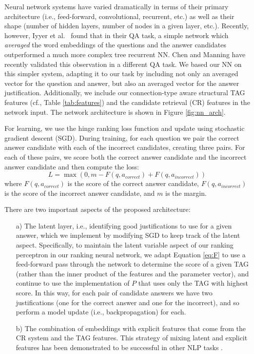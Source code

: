 {Neural network systems have varied dramatically in terms of their primary architecture (i.e., feed-forward, convolutional, recurrent, etc.) as well as their shape (number of hidden layers, number of nodes in a given layer, etc.).  Recently, however, Iyyer et al.~\citeyear{Iyyer2015} found that in their QA task, a simple network which \emph{averaged} the word embeddings of the questions and the answer candidates outperformed a much more complex tree recurrent NN.  
Chen and Manning \citeyear{chen2016acl} have recently validated this observation in a different QA task.
We based our NN on this simpler system, adapting it to our task by including not only an averaged vector for the question and answer, but also an averaged vector for the answer justification.  Additionally, we include our connection-type aware structural TAG features (cf., Table \ref{tab:features}) and the candidate retrieval (CR) features in the network input.  The network architecture is shown in Figure \ref{fig:nn_arch}.

For learning, we use the hinge ranking loss function \cite{collobert2011natural} and update using stochastic gradient descent (SGD).  During training, for each question we pair the correct answer candidate with each of the incorrect candidates, creating three pairs.  For each of these pairs, we score both the correct answer candidate and the incorrect answer candidate and then compute the loss:
\begin{equation}
L = \max (0, m - F(q,a_{correct}) + F(q,a_{incorrect}))
\end{equation}
where $F(q,a_{correct})$ is the score of the correct answer candidate, $F(q,a_{incorrect})$ is the score of the incorrect answer candidate, and $m$ is the margin.


There are two important aspects of the proposed architecture:
\begin{enumerate}
\item[a)] The latent layer, i.e., identifying good justifications to use for a given answer, which we implement by modifying SGD to keep track of the latent aspect.  Specifically, to maintain the latent variable aspect of our ranking perceptron in our ranking neural network, we adapt Equation \ref{eq:F} to use a feed-forward pass through the network to determine the score of a given TAG (rather than the inner product of the features and the parameter vector), and continue to use the implementation of $P$ that uses only the TAG with highest score.  In this way, for each pair of candidate answers we have two justifications (one for the correct answer and one for the incorrect), and so perform a model update (i.e., backpropagation) for each.
\item[b)] The combination of embeddings with explicit features that come from the CR system and the TAG features.  This strategy of mixing latent and explicit features has been demonstrated to be successful in other NLP tasks \cite{chen2014fast,suggu2016deep}.
\end{enumerate} 

}
